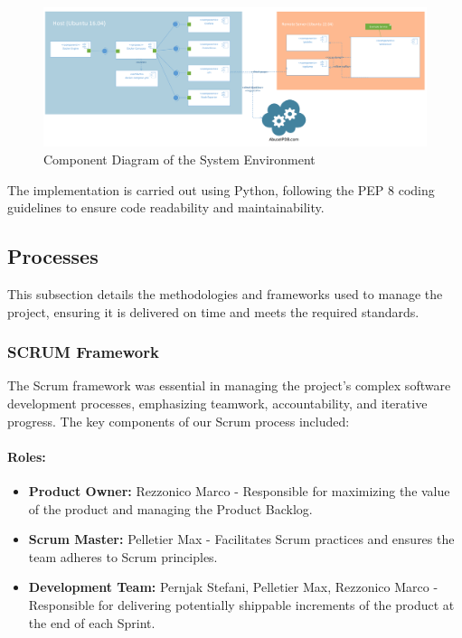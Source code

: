 \documentclass{article}
\begin{document}
    \begin{figure}[H]
        \centering
        \includegraphics[width=\textwidth]{./images/component.png}
        \caption{Component Diagram of the System Environment}
        \label{fig:component_diagram}
    \end{figure}

    \noindent The implementation is carried out using Python, following the PEP 8 coding guidelines to ensure code readability and maintainability.

    \newpage
    \subsection{Processes}\label{subsec:processes}

    This subsection details the methodologies and frameworks used to manage the project, ensuring it is delivered on time and meets the required standards.

    \subsubsection{SCRUM Framework}

    The Scrum framework was essential in managing the project's complex software development processes, emphasizing teamwork, accountability, and iterative progress.
    The key components of our Scrum process included:

    \paragraph{Roles:}
    \begin{itemize}
        \item \textbf{Product Owner:} Rezzonico Marco - Responsible for maximizing the value of the product and managing the Product Backlog.
        \item \textbf{Scrum Master:} Pelletier Max - Facilitates Scrum practices and ensures the team adheres to Scrum principles.
        \item \textbf{Development Team:} Pernjak Stefani, Pelletier Max, Rezzonico Marco - Responsible for delivering potentially shippable increments of the product at the end of each Sprint.
    \end{itemize}
\end{document}
